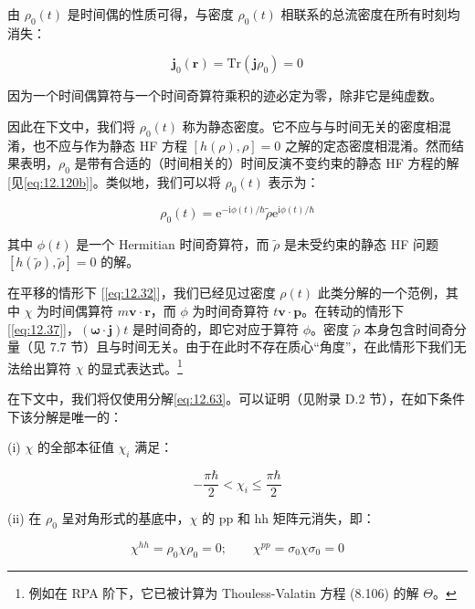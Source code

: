 由 $\rho_{0}(t)$ 是时间偶的性质可得，与密度 $\rho_{0}(t)$ 相联系的总流密度在所有时刻均消失：

\begin{equation}
\boldsymbol{j}_{0}(\boldsymbol{r})=\mathrm{Tr}(\boldsymbol{j}\rho_{0})=0\label{eq:12.65}
\end{equation}

因为一个时间偶算符与一个时间奇算符乘积的迹必定为零，除非它是纯虚数。

因此在下文中，我们将 $\rho_{0}(t)$ 称为静态密度。它不应与与时间无关的密度相混淆，也不应与作为静态 HF 方程 $[h(\rho),\rho]=0$
之解的定态密度相混淆。然而结果表明，$\rho_{0}$ 是带有合适的（时间相关的）时间反演不变约束的静态 HF 方程的解 {[}见\ref{eq:12.120b}{]}。类似地，我们可以将
$\rho_{0}(t)$ 表示为：

\begin{equation}
\rho_{0}(t)=\mathrm{e}^{-\mathrm{i}\phi(t)/\hbar}\tilde{\rho}\mathrm{e}^{\mathrm{i}\phi(t)/\hbar}\label{eq:12.66}
\end{equation}

其中 $\phi(t)$ 是一个 Hermitian 时间奇算符，而 $\tilde{\rho}$ 是未受约束的静态 HF 问题
$[h(\tilde{\rho}),\tilde{\rho}]=0$ 的解。

在平移的情形下 {[}\ref{eq:12.32}{]}，我们已经见过密度 $\rho(t)$ 此类分解的一个范例，其中 $\chi$
为时间偶算符 $m\boldsymbol{v}\cdot\boldsymbol{r}$，而 $\phi$ 为时间奇算符 $t\boldsymbol{v}\cdot\boldsymbol{p}$。在转动的情形下
{[}\ref{eq:12.37}{]}，$(\boldsymbol{\omega}\cdot\boldsymbol{j})t$
是时间奇的，即它对应于算符 $\phi$。密度 $\tilde{\rho}$ 本身包含时间奇分量（见 7.7 节）且与时间无关。由于在此时不存在质心“角度”，在此情形下我们无法给出算符
$\chi$ 的显式表达式。\footnote{例如在 RPA 阶下，它已被计算为 Thouless-Valatin 方程 (8.106) 的解 $\Theta$。}

在下文中，我们将仅使用分解\ref{eq:12.63}。可以证明（见附录 D.2 节），在如下条件下该分解是唯一的：

(i) $\chi$ 的全部本征值 $\chi_{i}$ 满足：

\begin{equation}
-\frac{\pi\hbar}{2}<\chi_{i}\leqslant\frac{\pi\hbar}{2}\label{eq:12.67a}
\end{equation}

(ii) 在 $\rho_{0}$ 呈对角形式的基底中，$\chi$ 的 pp 和 hh 矩阵元消失，即：

\begin{equation}
\chi^{hh}=\rho_{0}\chi\rho_{0}=0;\qquad\chi^{pp}=\sigma_{0}\chi\sigma_{0}=0\label{eq:12.67b}
\end{equation}

